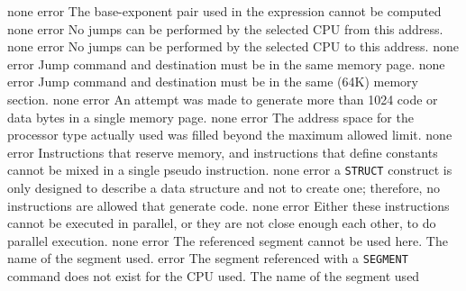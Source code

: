 \documentclass[12pt,twoside]{report}
\newcommand{\tty}[1]{{\tt #1}}
\begin{document}
\begin{description}
               {none}
               {error}
               {The base-exponent pair used in the expression cannot be
                computed}
               {none}
               {error}
               {No jumps can be performed by the selected CPU from this
                address.}
               {none}
               {error}
               {No jumps can be performed by the selected CPU to this
                address.}
               {none}
               {error}
               {Jump command and destination must be in the same memory
                page.}
               {none}
               {error}
               {Jump command and destination must be in the same (64K)
                memory section.}
               {none}
               {error}
               {An attempt was made to generate more than 1024 code or
                data bytes in a single memory page.}
               {none}
               {error}
               {The address space for the processor type actually used was
                filled beyond the maximum allowed limit.}
               {none}
               {error}
               {Instructions that reserve memory, and instructions that define
                constants cannot be mixed in a single pseudo instruction.}
               {none}
               {error}
               {a \tty{STRUCT} construct is only designed to describe a
                data structure and not to create one; therefore, no
                instructions are allowed that generate code.}
               {none}
               {error}
               {Either these instructions cannot be executed in parallel,
                or they are not close enough each other, to do parallel
                execution.}
               {none}
               {error}
               {The referenced segment cannot be used here.}
               {The name of the segment used.}
               {error}
               {The segment referenced with a \tty{SEGMENT} command does not
                exist for the CPU used.}
               {The name of the segment used}

\end{description}
\end{document}
